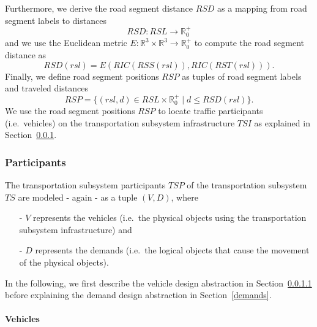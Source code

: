 Furthermore, we derive the road segment distance $RSD$ as a mapping from road segment labels to distances
\[
	RSD: RSL \rightarrow \mathbb{R}_0^+
\]
and we use the Euclidean metric $E: \mathbb{R}^3 \times \mathbb{R}^3 \rightarrow \mathbb{R}_0^+$ to compute the road segment distance as
\[
	RSD(rsl) = E(RIC(RSS(rsl)), RIC(RST(rsl))) \textrm{.}
\]
Finally, we define road segment positions $RSP$ as tuples of road segment labels and traveled distances
\[
	RSP = \{(rsl, d) \in RSL \times \mathbb{R}_0^+ \mid d \leq RSD(rsl)\} \textrm{.}
\]
We use the road segment positions $RSP$ to locate traffic participants (i.e.\ vehicles) on the transportation subsystem infrastructure $TSI$ as explained in Section~\ref{participants}.

\subsubsection{Participants}
\label{participants}

The transportation subsystem participants $TSP$ of the transportation subsystem $TS$ are modeled - again - as a tuple $(V, D)$, where
\begin{itemize}
	\item[-] $V$ represents the vehicles (i.e.\ the physical objects using the transportation subsystem infrastructure) and
	\item[-] $D$ represents the demands (i.e.\ the logical objects that cause the movement of the physical objects).
\end{itemize}
In the following, we first describe the vehicle design abstraction in Section~\ref{vehicles} before explaining the demand design abstraction in Section~\ref{demands}.

\paragraph{Vehicles}
\label{vehicles}

